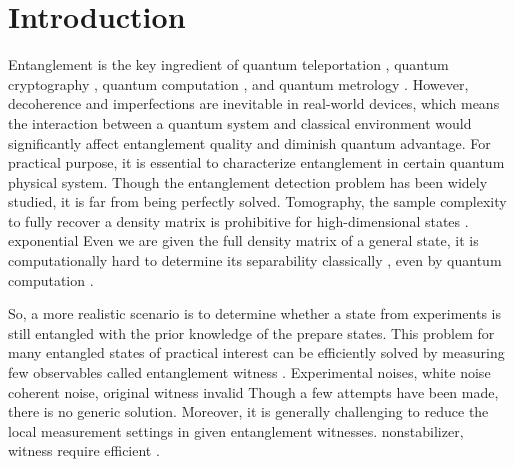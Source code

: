 \documentclass[
aps,
pra,
twocolumn,
floatfix,
]{revtex4-2}
\theoremstyle{plain}
\theoremstyle{definition}
\newcommand{\qi}[1]{\textcolor{blue}{(Qi: #1)}}
\begin{document}
\section{Introduction}
Entanglement \cite{horodeckiQuantumEntanglement2009} is the key ingredient of quantum teleportation \cite{bennettTeleportingUnknownQuantum1993}, quantum cryptography \cite{ekertQuantumCryptographyBased1991}, quantum computation \cite{briegelMeasurementbasedQuantumComputation2009}, and quantum metrology \cite{giovannettiQuantumenhancedMeasurementsBeating2004}.
However, decoherence and imperfections are inevitable in real-world devices, which means the interaction between a quantum system and classical environment would significantly affect entanglement quality and diminish quantum advantage. 
For practical purpose, it is essential to characterize entanglement in certain quantum physical system.
Though the entanglement detection problem \cite{guhneEntanglementDetection2009} has been widely studied,
it is far from being perfectly solved. 
Tomography,  the sample complexity to fully recover a density matrix is prohibitive for high-dimensional states \cite{haahSampleoptimalTomographyQuantum2017} \cite{odonnellEfficientQuantumTomography2016}.
exponential
Even we are given the full density matrix of a general state, it is computationally hard to determine its separability classically \cite{gurvitsClassicalDeterministicComplexity2003}, even by quantum computation \cite{gutoskiQuantumInteractiveProofs2015}.

So, a more realistic scenario is to determine whether a state from experiments is still entangled
with the prior knowledge of the prepare states. 
This problem for many entangled states of practical interest can be efficiently solved by measuring few observables called entanglement witness \cite{bourennaneWitnessingMultipartiteEntanglement2004} \cite{tothDetectingGenuineMultipartite2005} \cite{tothEntanglementDetectionStabilizer2005}.
Experimental noises,  white noise 
coherent noise,   original witness invalid 
Though a few attempts have been made, there is no generic solution.
Moreover, it is generally challenging to reduce the local measurement settings in given entanglement witnesses.  nonstabilizer,  witness require   efficient \cite{zhangEfficientEntanglementGeneration2021}. 
\end{document}
